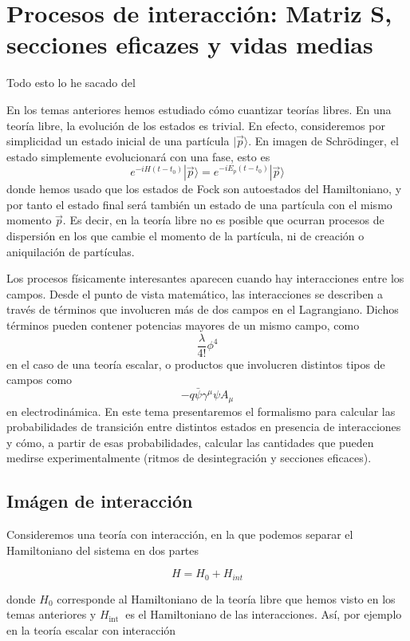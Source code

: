 \setchapterpreamble[u]{\margintoc}
\chapter{Procesos de interacción: Matriz S, secciones eficazes y vidas medias}

\begin{center}
  \large Todo esto lo he sacado del \cite{Dobdado}
\end{center}
En los temas anteriores hemos estudiado cómo cuantizar teorías libres. En una teoría libre, la evolución de los estados es trivial. En efecto, consideremos por simplicidad un estado inicial de una partícula $|\vec{p}\rangle$. En imagen de Schrödinger, el estado simplemente evolucionará con una fase, esto es
$$
e^{-i H\left(t-t_{0}\right)}|\vec{p}\rangle=e^{-i E_{p}\left(t-t_{0}\right)}|\vec{p}\rangle
$$
donde hemos usado que los estados de Fock son autoestados del Hamiltoniano, y por tanto el estado final será también un estado de una partícula con el mismo momento $\vec{p}$. Es decir, en la teoría libre no es posible que ocurran procesos de dispersión en los que cambie el momento de la partícula, ni de creación o aniquilación de partículas.

Los procesos físicamente interesantes aparecen cuando hay interacciones entre los campos. Desde el punto de vista matemático, las interacciones se describen a través de términos que involucren más de dos campos en el Lagrangiano. Dichos términos pueden contener potencias mayores de un mismo campo, como
$$
\frac{\lambda}{4!} \phi^{4}
$$
en el caso de una teoría escalar, o productos que involucren distintos tipos de campos como
$$
-q \bar{\psi} \gamma^{\mu} \psi A_{\mu}
$$
en electrodinámica.
En este tema presentaremos el formalismo para calcular las probabilidades de transición entre distintos estados en presencia de interacciones y cómo, a partir de esas probabilidades, calcular las cantidades que pueden medirse experimentalmente (ritmos de desintegración y secciones eficaces).
\section{Imágen de interacción}
Consideremos una teoría con interacción, en la que podemos separar el Hamiltoniano del sistema en dos partes

\begin{equation*}
H=H_{0}+H_{i n t} \tag{7.1}
\end{equation*}

donde $H_{0}$ corresponde al Hamiltoniano de la teoría libre que hemos visto en los temas anteriores y $H_{\text {int }}$ es el Hamiltoniano de las interacciones. Así, por ejemplo en la teoría escalar con interacción

